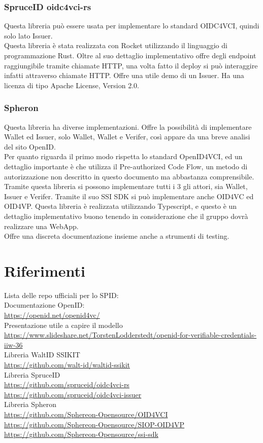 \subsubsection{SpruceID oidc4vci-rs}
Questa libreria può essere usata per implementare lo standard OIDC4VCI, quindi solo lato Issuer.\\
Questa libreria è stata realizzata con Rocket utilizzando il linguaggio di programmazione Rust.
Oltre al suo dettaglio implementativo offre degli endpoint raggiungibile tramite chiamate HTTP, 
una volta fatto il deploy si può interaggire infatti attraverso chiamate HTTP.
Offre una utile demo di un Issuer.
Ha una licenza di tipo  Apache License, Version 2.0.

\subsubsection{Spheron}
Questa libreria ha diverse implementazioni.
Offre la possibilità di implementare Wallet ed Issuer, solo Wallet, Wallet e Verifer, così appare da una breve analisi del sito OpenID.\\
Per quanto riguarda il primo modo rispetta lo standard OpenID4VCI, ed un dettaglio importante
è che utilizza il Pre-authorized Code Flow, un metodo di autorizzazione non descritto in questo documento ma abbastanza comprensibile.\\
Tramite questa libreria si possono implementare tutti i 3 gli attori, sia Wallet, Issuer e Verifer.
Tramite il suo SSI SDK si può implementare anche OID4VC ed OID4VP.
Questa libreria è realizzata utilizzando Typescript, e questo è un dettaglio implementativo buono tenendo in considerazione
che il gruppo dovrà realizzare una WebApp.\\
Offre una discreta documentazione insieme anche a strumenti di testing.\\



\section{Riferimenti}
Lista delle repo ufficiali per lo SPID:
\\ Documentazione OpenID:
\\ \url{https://openid.net/openid4vc/}
\\ Presentazione utile a capire il modello
\\ \url{https://www.slideshare.net/TorstenLodderstedt/openid-for-verifiable-credentials-iiw-36}
\\ Libreria WaltID SSIKIT
\\ \url{https://github.com/walt-id/waltid-ssikit}
\\ Libreria SpruceID
\\ \url{https://github.com/spruceid/oidc4vci-rs}
\\ \url{https://github.com/spruceid/oidc4vci-issuer}
\\ Libreria Spheron
\\ \url{https://github.com/Sphereon-Opensource/OID4VCI}
\\ \url{https://github.com/Sphereon-Opensource/SIOP-OID4VP}
\\ \url{https://github.com/Sphereon-Opensource/ssi-sdk}
